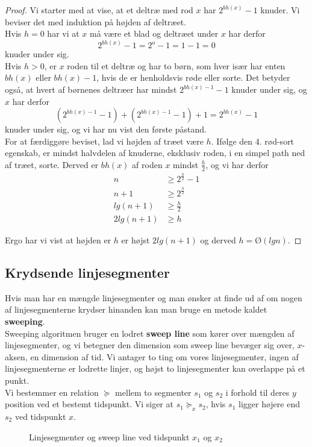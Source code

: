 \begin{proof}
  Vi starter med at vise, at et deltræ med rod $x$ har $2^{bh(x)}- 1$ knuder. Vi beviser det med induktion på højden af deltræet.\\
  Hvis $h=0$ har vi at $x$ må være et blad og deltræet under $x$ har derfor
  $$2^{bh(x)} - 1 = 2^o - 1 = 1 - 1 = 0$$
  knuder under sig.\\

  Hvis $h > 0$, er $x$ roden til et deltræ og har to børn, som hver især har enten $bh(x)$ eller $bh(x) - 1$, hvis de er henholdsvis røde eller sorte. Det betyder også, at hvert af børnenes deltræer har mindst $2^{bh(x)-1}-1$ knuder under sig, og $x$ har derfor
  $$(2^{bh(x)-1} - 1) + (2^{bh(x)-1} - 1) + 1 = 2^{bh(x)} - 1$$
  knuder under sig, og vi har nu vist den første påstand.\\

  For at færdiggøre beviset, lad vi højden af træet være $h$. Ifølge den 4. rød-sort egenskab, er mindst halvdelen af knuderne, eksklusiv roden, i en simpel path ned af træet, sorte. Derved er $bh(x)$ af roden $x$ mindst $\frac{h}{2}$, og vi har derfor
  \begin{align*}
           n &\geq 2^{\frac{h}{2}} - 1\\
       n + 1 &\geq 2^{\frac{h}{2}}\\
     lg(n+1) &\geq \frac{h}{2}\\
    2lg(n+1) &\geq h
  \end{align*}

  Ergo har vi vist at højden er $h$ er højst $2lg(n+1)$ og derved $h=Ø(lgn)$.
\end{proof}
\subsection{Krydsende linjesegmenter}
Hvis man har en mængde linjesegmenter og man ønsker at finde ud af om nogen af linjesegmenterne krydser hinanden kan man bruge en metode kaldet \textbf{sweeping}.\\
Sweeping algoritmen bruger en lodret \textbf{sweep line} som kører over mængden af linjesegmenter, og vi betegner den dimension som sweep line bevæger sig over, $x$-aksen, en dimension af tid. Vi antager to ting om vores linjesegmenter, ingen af linjesegmenterne er lodrette linjer, og højst to linjesegmenter kan overlappe på et punkt.\\

Vi bestemmer en relation $\succeq$ mellem to segmenter $s_1$ og $s_2$ i forhold til deres $y$ position ved et bestemt tidspunkt. Vi siger at $s_1 \succeq_x s_2$, hvis $s_1$ ligger højere end $s_2$ ved tidspunkt $x$.
\begin{figure}[H]
  \centering
  \caption{Linjesegmenter og sweep line ved tidspunkt $x_1$ og $x_2$}
\end{figure}

